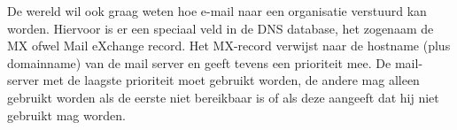 De wereld wil ook graag weten hoe e-mail naar een organisatie verstuurd kan worden. Hiervoor is er een speciaal veld in de DNS database, het zogenaam de MX ofwel Mail eXchange record. Het MX-record verwijst naar de hostname (plus domainname) van de mail server en geeft tevens een prioriteit mee. De mail-server met de laagste prioriteit moet gebruikt worden, de andere mag alleen gebruikt worden als de eerste niet bereikbaar is of als deze aangeeft dat hij niet gebruikt mag worden.

